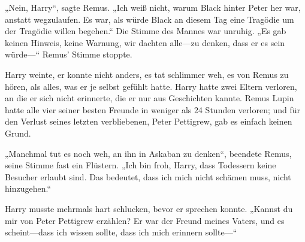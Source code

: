 „Nein, Harry“, sagte Remus. „Ich weiß nicht, warum Black hinter Peter her war, anstatt wegzulaufen. Es war, als würde Black an diesem Tag eine Tragödie um der Tragödie willen begehen.“ Die Stimme des Mannes war unruhig. „Es gab keinen Hinweis, keine Warnung, wir dachten alle—zu denken, dass er es sein würde—“ Remus’ Stimme stoppte.

Harry weinte, er konnte nicht anders, es tat schlimmer weh, es von Remus zu hören, als alles, was er je selbst gefühlt hatte. Harry hatte zwei Eltern verloren, an die er sich nicht erinnerte, die er nur aus Geschichten kannte. Remus Lupin hatte alle vier seiner besten Freunde in weniger als 24 Stunden verloren; und für den Verlust seines letzten verbliebenen, Peter Pettigrew, gab es einfach keinen Grund.

„Manchmal tut es noch weh, an ihn in Askaban zu denken“, beendete Remus, seine Stimme fast ein Flüstern. „Ich bin froh, Harry, dass Todessern keine Besucher erlaubt sind. Das bedeutet, dass ich mich nicht schämen muss, nicht hinzugehen.“

Harry musste mehrmals hart schlucken, bevor er sprechen konnte. „Kannst du mir von Peter Pettigrew erzählen? Er war der Freund meines Vaters, und es scheint—dass ich wissen sollte, dass ich mich erinnern sollte—“

